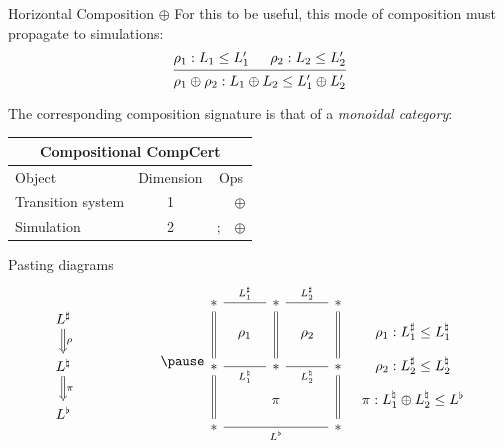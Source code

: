 \documentclass[aspectratio=1610,12pt]{beamer}
\begin{document}
\begin{frame}{Horizontal Composition $\oplus$} %
  For this to be useful, this mode of composition must propagate to simulations:
  \[
    \begin{prooftree}
      \hypo{\rho_1 : L_1 \le L_1'}
      \hypo{\rho_2 : L_2 \le L_2'}
      \infer2{\rho_1 \oplus \rho_2 : L_1 \oplus L_2 \le L_1' \oplus L_2'}
    \end{prooftree}
  \]

  \vfill
  The corresponding composition signature is that of a \emph{monoidal category}:
  \begin{center}
    \begin{tabular}{lccc}
      \toprule
      \multicolumn{4}{c}{\textbf{Compositional CompCert}} \\
      \midrule
      Object & Dimension & \multicolumn{2}{c}{Ops} \\
      \midrule
      Transition system & 1 & & $\oplus$ \\
      Simulation & 2 & $\mathbin;$ & $\oplus$ \\
      \bottomrule
    \end{tabular}
  \end{center}
\end{frame}

\begin{frame}[fragile]{Pasting diagrams} %
\[
  \begin{tikzcd}
    L^\sharp \ar[d, "\rho", Rightarrow] \\
    L^\natural \ar[d, "\pi", Rightarrow] \\
    L^\flat
  \end{tikzcd}
  \qquad\qquad\qquad\pause
  \begin{tikzcd}[sep=tiny]
    * \ar[dd, equal] \ar[rr, "L_1^\sharp", dash] &&
    * \ar[dd, equal] \ar[rr, "L_2^\sharp", dash] &&
    * \ar[dd, equal]
    \\
    & \rho_1 & & \rho_2 &
    & \rho_1 : L_1^\sharp \le L_1^\natural
    \\
    * \ar[dd, equal] \ar[rr, "L_1^\natural"', dash] &&
    * \ar[rr, "L_2^\natural"', dash] &&
    * \ar[dd, equal]
    & \rho_2 : L_2^\sharp \le L_2^\natural
    \\
    && \pi &&
    & \pi : L_1^\natural \oplus L_2^\natural \le L^\flat
    \\
    * \ar[rrrr, "L^\flat"', dash] && &&
    *
  \end{tikzcd}
\]
\end{frame}
\end{document}
